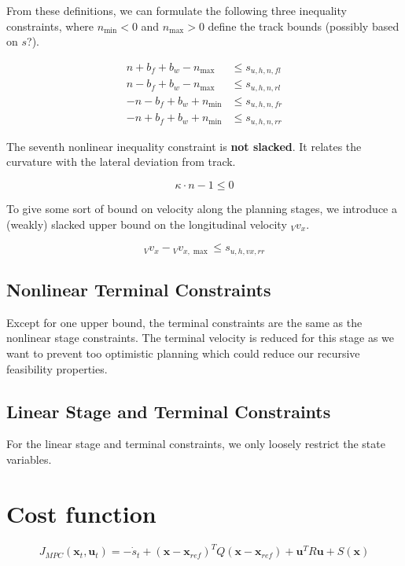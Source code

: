 \documentclass[
a4paper, %
10pt, %
notitlepage,
english]{CSUniSchoolLabReport}
\begin{document}
From these definitions, we can formulate the following three inequality constraints, where $n_{\min} < 0$ and $n_{\max}>0$ define the track bounds (possibly based on $s$?).

\begin{align}
	n + b_f + b_w - n_{\max} &\leq s_{u,h,n,fl} \\
	n - b_f + b_w - n_{\max} &\leq s_{u,h,n,rl} \\
	- n - b_f + b_w + n_{\min} &\leq s_{u,h,n,fr} \\
	- n + b_f + b_w + n_{\min} &\leq s_{u,h,n,rr}	
\end{align}

The seventh nonlinear inequality constraint is \textbf{not slacked}. It relates the curvature with the lateral deviation from track.

\begin{equation}
	\kappa \cdot n - 1 \leq 0
\end{equation}

To give some sort of bound on velocity along the planning stages, we introduce a (weakly) slacked upper bound on the longitudinal velocity ${}_Vv_x$.

\begin{equation}
	{}_Vv_x - {}_Vv_{x, \max} \leq s_{u,h,vx,rr}
\end{equation}

\subsection{Nonlinear Terminal Constraints}

Except for one upper bound, the terminal constraints are the same as the nonlinear stage constraints. The terminal velocity is reduced for this stage as we want to prevent too optimistic planning which could reduce our recursive feasibility properties.

\subsection{Linear Stage and Terminal Constraints}

For the linear stage and terminal constraints, we only loosely restrict the state variables.


\section{Cost function}
\begin{center}
	\begin{equation}
		J_{MPC}(\textbf{x}_t, \textbf{u}_t) = -\dot{s}_t + (\textbf{x} - \textbf{x}_{ref})^T Q (\textbf{x} - \textbf{x}_{ref}) + \textbf{u}^T R \textbf{u} + S(\textbf{x})
	\end{equation}
\end{center}
\end{document}
